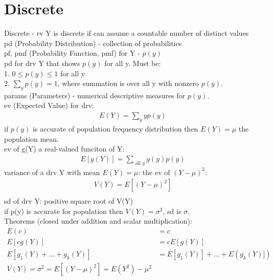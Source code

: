 \documentclass[12pt]{article}
\begin{document}
\section{Discrete}
	Discrete - rv Y is discrete if can assume a countable number of distinct values \\
	pd (Probability Distribution) - collection of probabilities \\
	pf, pmf (Probability Function, pmf) for Y - $ p(y) $ \\
	pd for drv Y that shows $ p(y) $ for all y. Must be: \\
	1. $ 0 \le p(y) \le 1 $ for all y \\
	2. $ \sum_y p(y) = 1 $, where summation is over all y with nonzero $ p(y) $.\\
	params (Parameters) - numerical descriptive measures for $ p(y) $. \\
	ev (Expected Value) for drv:
	\begin{align*}
		E(Y) = \sum_y yp(y)
	\end{align*}
	if $ p(y) $ is accurate of population frequency distribution then
	$ E(Y) = \mu $ the population mean. \\
	ev of g(Y) a real-valued funciton of Y:
	\begin{align*}
		E[g(Y)] = \sum_{\text{ all } y }g(y)p(y)
	\end{align*}
	variance of a drv Y with mean $ E(Y) = \mu $: the ev of $ (Y-\mu)^2 $:
	\begin{align*}
		V(Y) = E[(Y-\mu)^2] \\
	\end{align*}
	sd of drv Y: positive square root of V(Y) \\
	if p(y) is accurate for population then $ V(Y) = \sigma^2 $, sd is $ \sigma $. \\
	Theorems (closed under addition and scalar multiplication):
	\begin{align*}
		E(c) &= c \\
		E[cg(Y)] &= cE[g(Y)] \\
		E[g_1(Y)+...+g_k(Y)] &= E[g_1(Y)] + ... + E(g_k(Y)]) \\
		V(Y) = \sigma^2 = E[(Y-\mu)^2] =  E(Y^2) - \mu^2 \\
	\end{align*}
\end{document}
